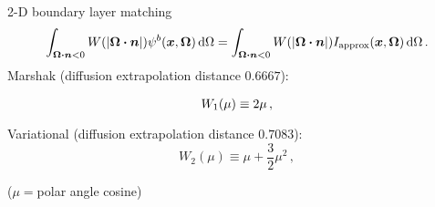 \documentclass{beamer}
\begin{document}
%
%  

\begin{frame}{2-D boundary layer matching}
\begin{equation*}
\int_{\bm{\Omega}\bm{\cdot}\bm{n} < 0} W( \left| \bm{\Omega}\bm{\cdot}\bm{n} \right|)
\psi^b(\bm{x}, \bm{\Omega}) \mathop{}\!\mathrm{d}\Omega
=
\int_{\bm{\Omega}\bm{\cdot}\bm{n} < 0} W( \left| \bm{\Omega}\bm{\cdot}\bm{n} \right|)
I_\text{approx}(\bm{x}, \bm{\Omega}) \mathop{}\!\mathrm{d}\Omega \,.
\end{equation*}
Marshak (diffusion extrapolation distance $0.6667$):
\begin{equation*}
  W_1(\mu) \equiv \vphantom{\frac12} 2 \mu \,,
\end{equation*}
Variational (diffusion extrapolation distance $0.7083$):
\begin{equation*}
   W_2(\mu) \equiv \mu + \frac{3}{2} \mu^2 \,,
\end{equation*}

($\mu={}$polar angle cosine)
\end{frame}
\end{document}
